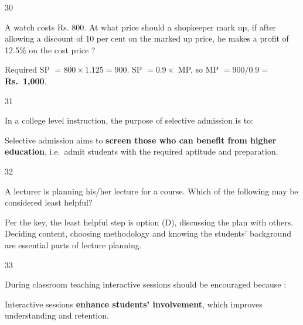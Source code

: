\begin{question}{30}
{A watch costs Rs. 800. At what price should a shopkeeper mark up, if after allowing a discount of 10 per cent on the marked up price, he makes a profit of 12.5\% on the cost price ?\par}
\begin{explain}
Required SP $=800\times1.125=900$. SP $=0.9\times$ MP, so MP $=900/0.9=$ \textbf{Rs.~1,000}.
\end{explain}
\end{question}

\begin{question}{31}
{In a college level instruction, the purpose of selective admission is to:\par}
\begin{explain}
Selective admission aims to \textbf{screen those who can benefit from higher education}, i.e.\ admit students with the required aptitude and preparation.
\end{explain}
\end{question}

\begin{question}{32}
{A lecturer is planning his/her lecture for a course. Which of the following may be considered least helpful?\par}
\begin{explain}
Per the key, the least helpful step is option (D), discussing the plan with others. Deciding content, choosing methodology and knowing the students' background are essential parts of lecture planning.
\end{explain}
\end{question}

\begin{question}{33}
{During classroom teaching interactive sessions should be encouraged because :\par}
\begin{explain}
Interactive sessions \textbf{enhance students' involvement}, which improves understanding and retention.
\end{explain}
\end{question}

